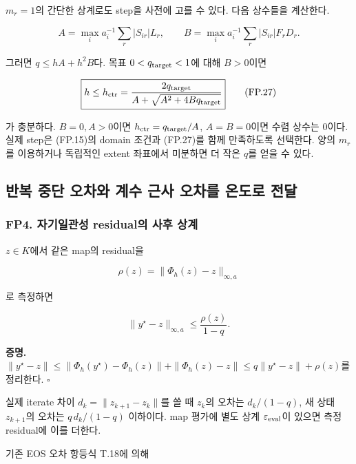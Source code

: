 \(m_r=1\)의 간단한 상계로도 step을 사전에 고를 수 있다. 다음 상수들을 계산한다.

\[
A=\max_i a_i^{-1}\sum_r|S_{ir}|L_r,\qquad
B=\max_i a_i^{-1}\sum_r|S_{ir}|F_rD_r.
\tag{FP.26}
\]

그러면 \(q\le hA+h^2B\)다. 목표 \(0<q_{\rm target}<1\)에 대해 \(B>0\)이면

\[
\boxed{
h\le h_{\rm ctr}
=\frac{2q_{\rm target}}
{A+\sqrt{A^2+4Bq_{\rm target}}}
}
\tag{FP.27}
\]

가 충분하다. \(B=0,A>0\)이면 \(h_{\rm ctr}=q_{\rm target}/A\), \(A=B=0\)이면 수렴 상수는 0이다. 실제 step은 (FP.15)의 domain 조건과 (FP.27)를 함께 만족하도록 선택한다. 양의 \(m_r\)를 이용하거나 독립적인 extent 좌표에서 미분하면 더 작은 \(q\)를 얻을 수 있다.

\hypertarget{uxbc18uxbcf5-uxc911uxb2e8-uxc624uxcc28uxc640-uxacc4uxc218-uxadfcuxc0ac-uxc624uxcc28uxb97c-uxc628uxb3c4uxb85c-uxc804uxb2ec}{%
\subsection{반복 중단 오차와 계수 근사 오차를 온도로 전달}\label{uxbc18uxbcf5-uxc911uxb2e8-uxc624uxcc28uxc640-uxacc4uxc218-uxadfcuxc0ac-uxc624uxcc28uxb97c-uxc628uxb3c4uxb85c-uxc804uxb2ec}}

\hypertarget{fp4.-uxc790uxae30uxc77cuxad00uxc131-residualuxc758-uxc0acuxd6c4-uxc0c1uxacc4}{%
\subsubsection{FP4. 자기일관성 residual의 사후 상계}\label{fp4.-uxc790uxae30uxc77cuxad00uxc131-residualuxc758-uxc0acuxd6c4-uxc0c1uxacc4}}

\(z\in K\)에서 같은 map의 residual을

\[
\rho(z)=\|\Phi_h(z)-z\|_{\infty,a}
\]

로 측정하면

\[
\boxed{
\|y^\star-z\|_{\infty,a}
\le\frac{\rho(z)}{1-q}.
}
\tag{FP.28}
\]

\textbf{증명.} \(\|y^\star-z\|\le\|\Phi_h(y^\star)-\Phi_h(z)\|+\|\Phi_h(z)-z\| \le q\|y^\star-z\|+\rho(z)\)를 정리한다. \(\square\)

실제 iterate 차이 \(d_k=\|z_{k+1}-z_k\|\)를 쓸 때 \(z_k\)의 오차는 \(d_k/(1-q)\), 새 상태 \(z_{k+1}\)의 오차는 \(q\,d_k/(1-q)\) 이하이다. map 평가에 별도 상계 \(\varepsilon_{\rm eval}\)이 있으면 측정 residual에 이를 더한다.

기존 EOS 오차 항등식 T.18에 의해


